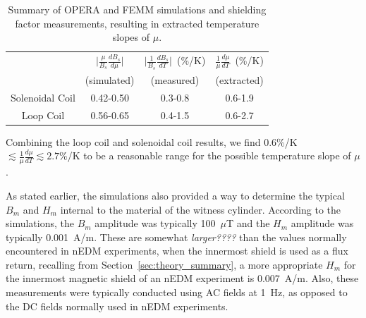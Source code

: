 \begin{table}
\begin{center}
\begin{tabular}{|c|c|c|c|}
\hline 
  & $\vert \frac{\mu}{B_s}\frac{dB_s}{d\mu}\vert$ & $\vert \frac{1}{B_s} \frac{dB_s}{dT}\vert$~(\%/K) & $\frac{1}{\mu}\frac{d\mu}{dT}$~(\%/K) \\ 
 & (simulated) & (measured) & (extracted) \\
\hline 
Solenoidal Coil & 0.42-0.50 & 0.3-0.8 & 0.6-1.9 \\ 
\hline 
Loop Coil & 0.56-0.65 & 0.4-1.5 & 0.6-2.7 \\ 
\hline 
\end{tabular} 
\caption{Summary of OPERA and FEMM simulations and shielding factor
  measurements, resulting in extracted temperature slopes of $\mu$.}
\label{tab:axialsummary}
\end{center}

\end{table}

Combining the loop coil and solenoidal coil results, we find
0.6\%/K~$\lesssim\frac{1}{\mu}\frac{d\mu}{dT}\lesssim 2.7\%$/K to be a
reasonable range for the possible temperature slope of $\mu$.

As stated earlier, the simulations also provided a way to determine
the typical $B_m$ and $H_m$ internal to the material of the witness
cylinder.  According to the simulations, the $B_m$ amplitude was
typically 100~$\mu$T and the $H_m$ amplitude was typically 0.001~A/m.
These are somewhat {\it larger????} than the values normally
encountered in nEDM experiments, when the innermost shield is used as
a flux return, recalling from Section~\ref{sec:theory_summary}, a more
appropriate $H_m$ for the innermost magnetic shield of an nEDM
experiment is 0.007~A/m.
Also, these measurements were typically conducted using AC fields at
1~Hz, as opposed to the DC fields normally used in nEDM experiments.
